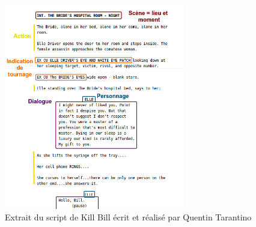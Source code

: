 \begin{figure}[ht!]
\centering
\includegraphics[width=0.7\textwidth]{images/ScriptExample-v1.png}
\caption{Extrait du script de Kill Bill écrit et réalisé par Quentin Tarantino}
\label{img:intro:script} 
\end{figure}








